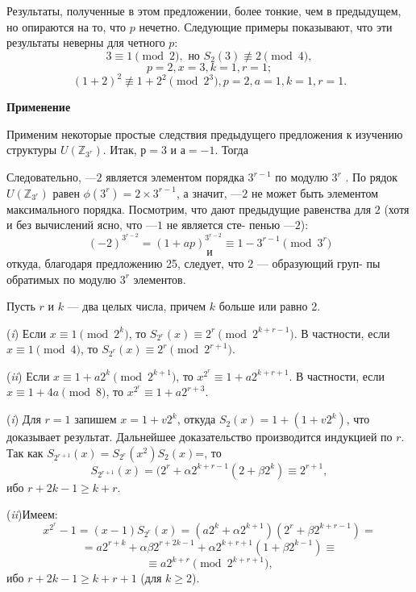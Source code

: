 \documentclass{../template/mai_book}
\begin{document}
\begin{mynotice}
Результаты, полученные в этом предложении, более\linebreak
тонкие, чем в предыдущем, но опираются на то, что $p$ нечетно.\linebreak
Следующие примеры показывают, что эти результаты неверны\linebreak
для четного $p$:
$$3\equiv 1\pmod{2}, \text{ но } S_2(3) \not\equiv 2 \pmod{4},$$
$$p = 2, x = 3, k = 1, r = 1;$$
$$(1 + 2)^2 \not\equiv 1 + 2^2\pmod{2^3}, p = 2, a = 1, k = 1, r = 1.$$
\end{mynotice}
\begin{beznomera}
\noindent \textbf{Применение}

Применим некоторые простые следствия предыдущего предложения\linebreak
к изучению структуры $U(\mathbb{Z}_{3^r})$. Итак, $р = 3$ и $а = - 1$. Тогда

Следовательно, $—2$ является элементом порядка $3^{r-1}$ по модулю $3^r$ . По­\linebreak
рядок $U(\mathbb{Z}_{3^r})$ равен $\phi (3^r) = 2 \times 3^{r-1}$, а значит, $—2$ не может быть\linebreak
элементом максимального порядка. Посмотрим, что дают предыдущие\linebreak
равенства для $2$ (хотя и без вычислений ясно, что $—1$ не является сте­-\linebreak
пенью $—2$):
$$(-2)^{3^{r-2}} = (1+ ap)^{3^{r-2}} \equiv 1 - 3^{r-1} \pmod{3^r}$$
$$\text{ и }$$
\noindent откуда, благодаря предложению 25, следует, что $2$ — образующий груп-\linebreak­
пы обратимых по модулю $3^r$ элементов.
\end{beznomera}
\begin{predl}
Пусть $r$ и $k$ — два целых числа, причем $k$ больше или равно 2.
\par (\textit{i}) Если $x \equiv 1 \pmod{2^k}$, то $S_{2^r}(x) \equiv 2^r \pmod{2^{k+r-1}}$. В частности,\linebreak
если $x \equiv 1 \pmod{4}$, то $S_{2^r}(x) \equiv 2^r \pmod{2^{r+1}}$.
\par (\textit{ii}) Если $x \equiv 1 + a2^k \pmod{2^{k+1}}$, то $x^{2^r} \equiv 1 + a2^{k+r+1}$.\linebreak
В частности, если $x \equiv 1 + 4a \pmod{8}$, то $x^{2^r} \equiv 1 + a2^{r+3}$.
\end{predl}
\begin{myproof}
\par (\textit{i}) Для $r = 1$ запишем $x = 1 + v2^k$, откуда $S_2(x) = 1 + (1+v2^k)$,\linebreak
что доказывает результат. Дальнейшее доказательство производится\linebreak
индукцией по $r$. Так как $S_{2^{r+1}}(x)= S_{2^{r}}(x^2)S_2(x)$=, то 
$$S_{2^{r+1}}(x)=(2^r+\alpha 2^{k+r-1}(2+\beta 2^{k})\equiv 2^{r+1},$$
ибо $r + 2k -1 \ge k + r$.
\par (\textit{ii})Имеем:
$$x^{2^r} - 1 = (x - 1)S_{2^r}(x) = (a2^{k} + \alpha 2^{k+1})(2^r+\beta 2^{k+r-1})=$$
$$= a2^{r+k}+\alpha \beta 2^{r +2k -1} + \alpha 2^{k+r+1}(1+\beta 2^{k-1})\equiv$$
$$\equiv a2^{k+r}\pmod{2^{k+r+1}},$$
ибо $r+2k-1\ge k + r +1$ (для $k \ge 2$).
\end{myproof}
\end{document}
